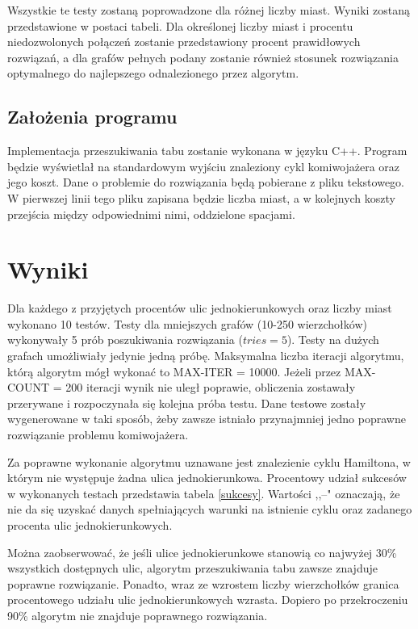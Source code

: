 \documentclass[11pt,a4paper,twoside]{article}
\begin{document}
Wszystkie te testy zostaną poprowadzone dla różnej liczby miast. Wyniki zostaną przedstawione w postaci tabeli. Dla określonej liczby miast i procentu niedozwolonych połączeń zostanie przedstawiony procent prawidłowych rozwiązań, a dla grafów pełnych podany zostanie również stosunek rozwiązania optymalnego do najlepszego odnalezionego przez algorytm. 
\subsection{Założenia programu}
Implementacja przeszukiwania tabu zostanie wykonana w języku C++. Program będzie wyświetlał na standardowym wyjściu znaleziony cykl komiwojażera oraz jego koszt. Dane o problemie do rozwiązania będą pobierane z pliku tekstowego. W pierwszej linii tego pliku zapisana będzie liczba miast, a w kolejnych koszty przejścia między odpowiednimi nimi, oddzielone spacjami.

\section{Wyniki}
Dla każdego z przyjętych procentów ulic jednokierunkowych oraz liczby miast wykonano 10 testów. Testy dla mniejszych grafów (10-250 wierzchołków) wykonywały 5 prób poszukiwania rozwiązania ($tries=5$). Testy na dużych grafach umożliwiały jedynie jedną próbę. Maksymalna liczba iteracji algorytmu, którą algorytm mógł wykonać to MAX-ITER = 10000. Jeżeli przez MAX-COUNT = 200 iteracji wynik nie uległ poprawie, obliczenia zostawały przerywane i rozpoczynała się kolejna próba testu. Dane testowe zostały wygenerowane w taki sposób, żeby zawsze istniało przynajmniej jedno poprawne rozwiązanie problemu komiwojażera.

Za poprawne wykonanie algorytmu uznawane jest znalezienie cyklu Hamiltona, w którym nie występuje żadna ulica jednokierunkowa. Procentowy udział sukcesów w wykonanych testach przedstawia tabela \ref{sukcesy}. Wartości ,,--" oznaczają, że nie da się uzyskać danych spełniających warunki na istnienie cyklu oraz zadanego procenta ulic jednokierunkowych. 

Można zaobserwować, że jeśli ulice jednokierunkowe stanowią co najwyżej 30\% wszystkich dostępnych ulic, algorytm przeszukiwania tabu zawsze znajduje poprawne rozwiązanie. Ponadto, wraz ze wzrostem liczby wierzchołków granica procentowego udziału ulic jednokierunkowych wzrasta. Dopiero po przekroczeniu 90\% algorytm nie znajduje poprawnego rozwiązania.
\end{document}
